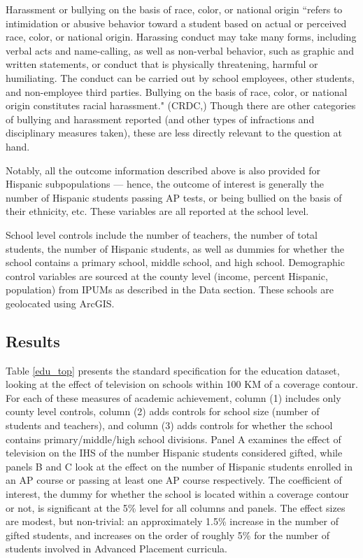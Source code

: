 \documentclass[11pt]{article}
\begin{document}
\begin{itemize}
Harassment or bullying on the basis of race, color, or national origin ``refers to intimidation or abusive behavior toward a student based on actual or perceived race, color, or national origin. Harassing conduct may take many forms, including verbal acts and name-calling, as well as non-verbal behavior, such as graphic and written statements, or conduct that is physically threatening, harmful or humiliating. The conduct can be carried out by school employees, other students, and non-employee third parties. Bullying on the basis of race, color, or national origin constitutes racial harassment." (CRDC,\cite{noauthor_master_2016}) Though there are other categories of bullying and harassment reported (and other types of infractions and disciplinary measures taken), these are less directly relevant to the question at hand.


\end{itemize}

Notably, all the outcome information described above is also provided for Hispanic subpopulations --- hence, the outcome of interest is generally the number of Hispanic students passing AP tests, or being bullied on the basis of their ethnicity, etc. These variables are all reported at the school level. 

School level controls include the number of teachers, the number of total students, the number of Hispanic students, as well as dummies for whether the school contains a primary school, middle school, and high school. Demographic control variables are sourced at the county level (income, percent Hispanic, population) from IPUMs as described in the Data section. These schools are geolocated using ArcGIS.

\subsection{Results}

Table \ref{edu_top} presents the standard specification for the education dataset, looking at the effect of television on schools within 100 KM of a coverage contour. For each of these measures of academic achievement, column (1) includes only county level controls, column (2) adds controls for school size (number of students and teachers), and column (3) adds controls for whether the school contains primary/middle/high school divisions. Panel A examines the effect of television on the IHS of the number Hispanic students considered gifted, while panels B and C look at the effect on the number of Hispanic students enrolled in an AP course or passing at least one AP course respectively. The coefficient of interest, the dummy for whether the school is located within a coverage contour or not, is significant at the 5\% level for all columns and panels. The effect sizes are modest, but non-trivial: an approximately 1.5\% increase in the number of gifted students, and increases on the order of roughly 5\% for the number of students involved in Advanced Placement curricula. 
\end{document}
